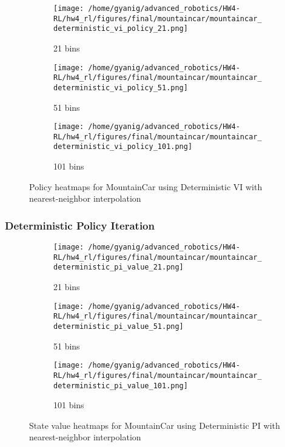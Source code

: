 \documentclass{article}
\begin{document}
\begin{figure}[H]
    \centering
    \begin{subfigure}{0.32\textwidth}
        \texttt{[image: /home/gyanig/advanced\_robotics/HW4-RL/hw4\_rl/figures/final/mountaincar/mountaincar\_deterministic\_vi\_policy\_21.png]}
        \caption{21 bins}
    \end{subfigure}
    \begin{subfigure}{0.32\textwidth}
        \texttt{[image: /home/gyanig/advanced\_robotics/HW4-RL/hw4\_rl/figures/final/mountaincar/mountaincar\_deterministic\_vi\_policy\_51.png]}
        \caption{51 bins}
    \end{subfigure}
    \begin{subfigure}{0.32\textwidth}
        \texttt{[image: /home/gyanig/advanced\_robotics/HW4-RL/hw4\_rl/figures/final/mountaincar/mountaincar\_deterministic\_vi\_policy\_101.png]}
        \caption{101 bins}
    \end{subfigure}
    \caption{Policy heatmaps for MountainCar using Deterministic VI with nearest-neighbor interpolation}
\end{figure}

\subsubsection{Deterministic Policy Iteration}
\begin{figure}[H]
    \centering
    \begin{subfigure}{0.32\textwidth}
        \texttt{[image: /home/gyanig/advanced\_robotics/HW4-RL/hw4\_rl/figures/final/mountaincar/mountaincar\_deterministic\_pi\_value\_21.png]}
        \caption{21 bins}
    \end{subfigure}
    \begin{subfigure}{0.32\textwidth}
        \texttt{[image: /home/gyanig/advanced\_robotics/HW4-RL/hw4\_rl/figures/final/mountaincar/mountaincar\_deterministic\_pi\_value\_51.png]}
        \caption{51 bins}
    \end{subfigure}
    \begin{subfigure}{0.32\textwidth}
        \texttt{[image: /home/gyanig/advanced\_robotics/HW4-RL/hw4\_rl/figures/final/mountaincar/mountaincar\_deterministic\_pi\_value\_101.png]}
        \caption{101 bins}
    \end{subfigure}
    \caption{State value heatmaps for MountainCar using Deterministic PI with nearest-neighbor interpolation}
\end{figure}
\end{document}
